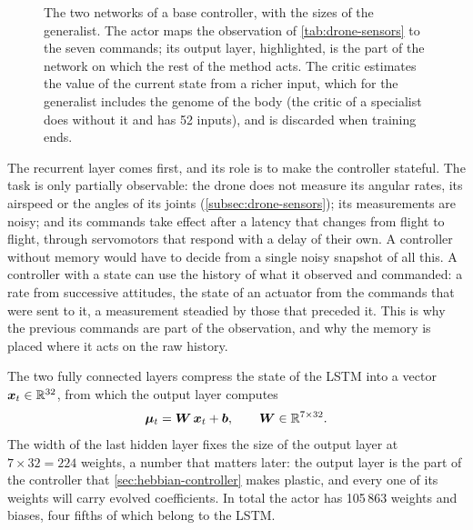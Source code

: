 \begin{figure}[htbp]
\caption[The networks of a base controller]{The two networks of a base controller, with the sizes of the generalist. The actor maps the observation of \autoref{tab:drone-sensors} to the seven commands; its output layer, highlighted, is the part of the network on which the rest of the method acts. The critic estimates the value of the current state from a richer input, which for the generalist includes the genome of the body (the critic of a specialist does without it and has 52 inputs), and is discarded when training ends.}
\label{fig:controller-architecture}
\end{figure}

The recurrent layer comes first, and its role is to make the controller stateful. The task is only partially observable: the drone does not measure its angular rates, its airspeed or the angles of its joints (\autoref{subsec:drone-sensors}); its measurements are noisy; and its commands take effect after a latency that changes from flight to flight, through servomotors that respond with a delay of their own. A controller without memory would have to decide from a single noisy snapshot of all this. A controller with a state can use the history of what it observed and commanded: a rate from successive attitudes, the state of an actuator from the commands that were sent to it, a measurement steadied by those that preceded it. This is why the previous commands are part of the observation, and why the memory is placed where it acts on the raw history.

The two fully connected layers compress the state of the LSTM into a vector $\bm{x}_t \in \mathbb{R}^{32}$, from which the output layer computes
\begin{equation}
\bm{\mu}_t = \bm{W}\, \bm{x}_t + \bm{b}, \qquad \bm{W} \in \mathbb{R}^{7 \times 32}.
\label{eq:actor-output}
\end{equation}
The width of the last hidden layer fixes the size of the output layer at $7 \times 32 = 224$ weights, a number that matters later: the output layer is the part of the controller that \autoref{sec:hebbian-controller} makes plastic, and every one of its weights will carry evolved coefficients. In total the actor has 105\,863 weights and biases, four fifths of which belong to the LSTM.

